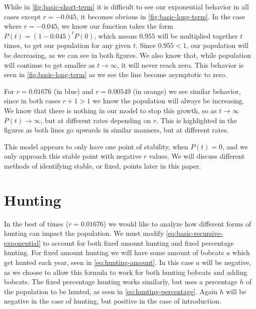 \documentclass{article}
\begin{document}

While in \autoref{fig:basic-short-term} it is difficult to see our exponential behavior in all cases except $r = -0.045$, it becomes obvious in \autoref{fig:basic-long-term}. In the case where $r = -0.045$, we know our function takes the form $P(t) = (1-0.045)^tP(0)$, which means $0.955$ will be multiplied together $t$ times, to get our population for any given $t$. Since $0.955 < 1$, our population will be decreasing, as we can see in both figures. We also know that, while population will continue to get smaller as $t \rightarrow \infty$, it will never reach zero. This behavior is seen in \autoref{fig:basic-long-term} as we see the line become asymptotic to zero.

For $r = 0.01676$ (in blue) and $r = 0.00549$ (in orange) we see similar behavior, since in both cases $r + 1 > 1$ we know the population will always be increasing. We know that there is nothing in our model to stop this growth, so as $t \rightarrow \infty$ $P(t) \rightarrow \infty$, but at different rates depending on $r$. This is highlighted in the figures as both lines go upwards in similar manners, but at different rates.

This model appears to only have one point of stability, when $P(t) = 0$, and we only approach this stable point with negative $r$ values. We will discuss different methods of identifying stable, or fixed, points later in this paper.

\section{Hunting}
In the best of times ($r = 0.01676$) we would like to analyze how different forms of hunting can impact the population. We must modify \autoref{eq:basic-recursive-exponential} to account for both fixed amount hunting and fixed percentage hunting. For fixed amount hunting we will have some amount of bobcats $a$ which get hunted each year, seen in \autoref{eq:hunting-amount}. In this case $a$ will be negative, as we choose to allow this formula to work for both hunting bobcats and adding bobcats. The fixed percentage hunting works similarly, but uses a percentage $h$ of the population to be hunted, as seen in \autoref{eq:hunting-percentage}. Again $h$ will be negative in the case of hunting, but positive in the case of introduction.
\end{document}
